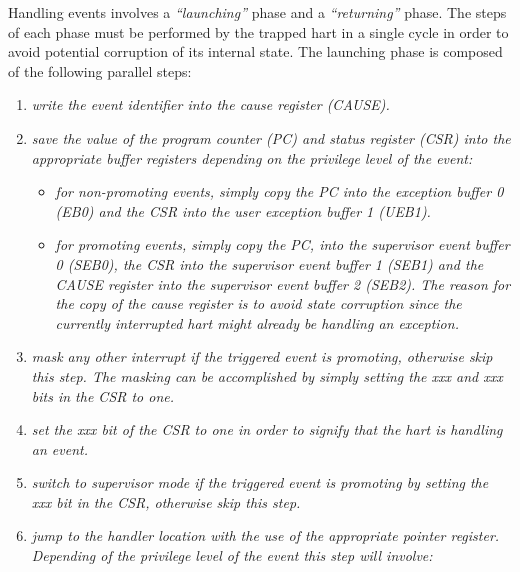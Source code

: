 \documentclass{article}
\begin{document}
            Handling events involves a \textit{``launching''} phase and a \textit{``returning''} phase. The steps of each phase must be performed by the trapped hart in a single cycle in order to avoid potential corruption of its internal state. The launching phase is composed of the following parallel steps:

            \begin{enumerate}

                \item \textit{write the event identifier into the cause register (CAUSE).}

                \item \textit{save the value of the program counter (PC) and status register (CSR) into the appropriate buffer registers depending on the privilege level of the event:}

                    \begin{itemize}

                        \item \textit{for non-promoting events, simply copy the PC into the exception buffer 0 (EB0) and the CSR into the user exception buffer 1 (UEB1).}

                        \item \textit{for promoting events, simply copy the PC, into the supervisor event buffer 0 (SEB0), the CSR into the supervisor event buffer 1 (SEB1) and the CAUSE register into the supervisor event buffer 2 (SEB2). The reason for the copy of the cause register is to avoid state corruption since the currently interrupted hart might already be handling an exception.}

                    \end{itemize}

                \item \textit{mask any other interrupt if the triggered event is promoting, otherwise skip this step. The masking can be accomplished by simply setting the xxx and xxx bits in the CSR to one.}

                \item \textit{set the xxx bit of the CSR to one in order to signify that the hart is handling an event.}

                \item \textit{switch to supervisor mode if the triggered event is promoting by setting the xxx bit in the CSR, otherwise skip this step.}

                \item \textit{jump to the handler location with the use of the appropriate pointer register. Depending of the privilege level of the event this step will involve:}


\end{enumerate}
\end{document}

